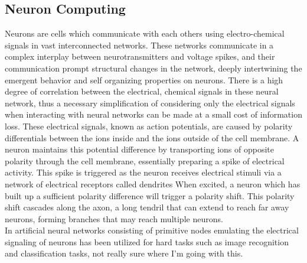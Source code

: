 \subsection{Neuron Computing}
Neurons are cells which communicate with each others using electro-chemical
signals in vast interconnected networks.
These networks communicate in a complex interplay between neurotransmitters and voltage
spikes, and their communication prompt structural changes in the network,
deeply intertwining the emergent behavior and self organizing properties on neurons.
There is a high degree of correlation between the electrical, chemical signals
in these neural network, thus a necessary simplification of considering only the
electrical signals when interacting with neural networks can be made at a small
cost of information loss.
These electrical signals, known as action potentials, are caused
by polarity differentials between the ions inside and the ions outside of the
cell membrane.
A neuron maintains this potential difference by transporting ions of opposite
polarity through the cell membrane, essentially preparing a spike of electrical
activity.
This spike is triggered as the neuron receives electrical stimuli via a network
of electrical receptors called dendrites
When excited, a neuron which has built up a sufficient polarity difference will
trigger a polarity shift.
This polarity shift cascades along the axon, a long tendril that can extend to
reach far away neurons, forming branches that may reach multiple neurons.\\
In artificial neural networks consisting of primitive nodes emulating the
electrical signaling of neurons has been utilized for hard tasks such as image
recognition and classification tasks, not really sure where I'm going with this.

